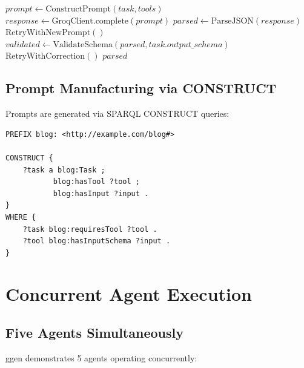 \begin{algorithm}
\caption{Groq Evaluation}
\begin{algorithmic}[1]
    \State $prompt \gets \text{ConstructPrompt}(task, tools)$
    \State $response \gets \text{GroqClient.complete}(prompt)$
    \State $parsed \gets \text{ParseJSON}(response)$
        \State \Return $\text{RetryWithNewPrompt}()$
    \EndIf
    \State $validated \gets \text{ValidateSchema}(parsed, task.output\_schema)$
        \State \Return $\text{RetryWithCorrection}()$
    \EndIf
    \State \Return $parsed$
\EndProcedure
\end{algorithmic}
\end{algorithm}

\subsection{Prompt Manufacturing via CONSTRUCT}

Prompts are generated via SPARQL CONSTRUCT queries:

\begin{verbatim}
PREFIX blog: <http://example.com/blog#>

CONSTRUCT {
    ?task a blog:Task ;
           blog:hasTool ?tool ;
           blog:hasInput ?input .
}
WHERE {
    ?task blog:requiresTool ?tool .
    ?tool blog:hasInputSchema ?input .
}
\end{verbatim}

\section{Concurrent Agent Execution}

\subsection{Five Agents Simultaneously}

ggen demonstrates 5 agents operating concurrently:

